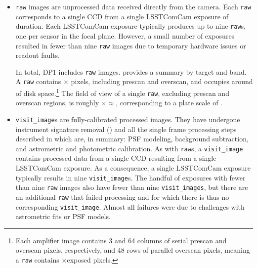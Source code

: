 \begin{itemize}
\item \texttt{raw} images are unprocessed data received directly from the camera.
Each \texttt{raw} corresponds to a single CCD from a single LSSTComCam exposure of \exposuretime duration.
Each LSSTComCam exposure typically produces up to nine \texttt{raw}s, one per sensor in the focal plane. 
However, a small number of exposures resulted in fewer than nine \texttt{raw} images due to temporary hardware issues or readout faults.

In total, DP1 includes \nraws \texttt{raw} images.
 provides a summary by target and band. 
A \texttt{raw} contains \nrawpixx $\times$ \nrawpixy pixels, including prescan and overscan, and occupies around \rawhdd of disk space.\footnote{Each amplifier image contains 3 and 64 columns of serial prescan and overscan pixels, respectively, and 48 rows of parallel overscan pixels, meaning a \texttt{raw} contains \nvisitimagepixx$\times$\nvisitimagepixy exposed pixels.}
The field of view of a single \texttt{raw}, excluding prescan and overscan regions, is roughly \visitimagefovx$\times$\visitimagefovy$\approx$\visitimagefov, corresponding to a plate scale of \rawplatescale.






\item \texttt{visit\_image}s are fully-calibrated processed images.
They have undergone instrument signature removal () and all the single frame processing steps described in  which are, in summary: PSF modeling, background subtraction, and astrometric and photometric calibration.
As with \texttt{raw}s, a \texttt{visit\_image} contains processed data from a single CCD resulting from a single \exposuretime LSSTComCam exposure.
As a consequence, a single LSSTComCam exposure typically results in nine \texttt{visit\_image}s.
The handful of exposures with fewer than nine \texttt{raw} images also have fewer than nine \texttt{visit\_images}, but there are an additional \nsfpfails \texttt{raw} that failed processing and for which there is thus no corresponding \texttt{visit\_image}. Almost all failures were due to challenges with astrometric fits or PSF models.  


\end{itemize}
